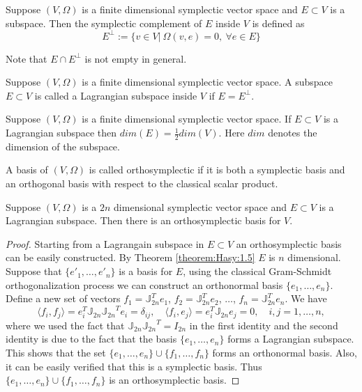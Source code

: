 \documentclass[final]{siamart}
\begin{document}
{{\color{black}} 
\begin{definition}  \cite{de2006symplectic}
Suppose $(V,\Omega)$ is a finite dimensional symplectic vector space and $E\subset V$ is a subspace. Then the symplectic complement of $E$ inside $V$ is defined as
\[
	E^{\perp} := \{ v\in V |\ \Omega(v,e) = 0,\ \forall e\in E \}
\]
\end{definition}
Note that $E \cap E^{\perp}$ is not empty in general. 
\begin{definition} \cite{de2006symplectic}
Suppose $(V,\Omega)$ is a finite dimensional symplectic vector space. A subspace $E\subset V$ is called a Lagrangian subspace inside $V$ if $E = E^\perp$.
\end{definition}
\begin{theorem} \label{theorem:Hasy:1.5} \cite{abraham1978foundations}
Suppose $(V,\Omega)$ is a finite dimensional symplectic vector space. If $E\subset V$ is a Lagrangian subspace then $dim(E)=\frac 1 2dim(V)$. Here $dim$ denotes the dimension of the subspace.
\end{theorem}
\begin{definition}
A basis of $(V,\Omega)$ is called orthosymplectic if it is both a symplectic basis and an orthogonal basis with respect to the classical scalar product.
\end{definition}
\begin{theorem} \label{theorem:Hasy:1.6}  \cite{da2003introduction}
Suppose $(V,\Omega)$ is a $2n$ dimensional symplectic vector space and $E\subset V$ is a Lagrangian subspace. Then there is an orthosymplectic basis for $V$.
\end{theorem}
\begin{proof}
Starting from a Lagrangain subspace in $E \subset V$ an orthosymplectic basis can be easily constructed. By Theorem \ref{theorem:Hasy:1.5} $E$ is $n$ dimensional. Suppose that $\{ e'_1,\dots, e'_n \}$ is a basis for $E$, using the classical Gram-Schmidt orthogonalization process we can construct an orthonormal basis $\{ e_1,\dots,e_n \}$. Define a new set of vectors $f_1 = \mathbb J_{2n}^Te_1$, $f_2 =\mathbb J_{2n}^T e_2$, $\dots$, $f_n= \mathbb J_{2n}^Te_n$. We have
\begin{equation}
	\langle f_i, f_j \rangle = e_i^T \mathbb J_{2n} {\mathbb J_{2n}}^T e_i = \delta_{ij}, \quad \langle f_i, e_j \rangle = e_i^T \mathbb J_{2n} e_j = 0, \quad i,j=1,\dots,n,
\end{equation}
where we used the fact that $\mathbb J_{2n} {\mathbb J_{2n}}^T = I_{2n}$ in the first identity and the second identity is due to the fact that the basis $\{ e_1,\dots,e_n \}$ forms a Lagrangian subspace. This shows that the set $\{ e_1,\dots,e_n \}\cup \{ f_1,\dots,f_n \}$ forms an orthonormal basis. Also, it can be easily verified that this is a symplectic basis. Thus $\{ e_1,\dots,e_n \}\cup \{ f_1,\dots,f_n \}$ is an orthosymplectic basis.

\end{proof}}
\end{document}
